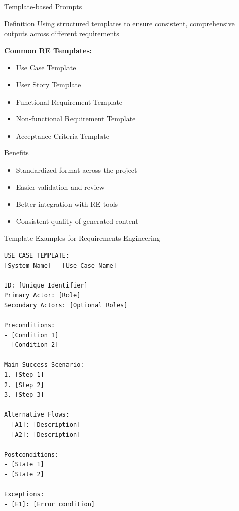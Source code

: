 \documentclass{beamer}
\begin{document}
\begin{frame}{Template-based Prompts}
    \begin{block}{Definition}
        Using structured templates to ensure consistent, comprehensive outputs across different requirements
    \end{block}
    
    \textbf{Common RE Templates:}
    \begin{itemize}
        \item Use Case Template
        \item User Story Template
        \item Functional Requirement Template
        \item Non-functional Requirement Template
        \item Acceptance Criteria Template
    \end{itemize}
    
    \begin{exampleblock}{Benefits}
        \begin{itemize}
            \item Standardized format across the project
        \item Easier validation and review
        \item Better integration with RE tools
        \item Consistent quality of generated content
        \end{itemize}
    \end{exampleblock}
\end{frame}

\begin{frame}[fragile]{Template Examples for Requirements Engineering}
    \begin{lstlisting}[style=code, caption={Use Case Template}]
USE CASE TEMPLATE:
[System Name] - [Use Case Name]

ID: [Unique Identifier]
Primary Actor: [Role]
Secondary Actors: [Optional Roles]

Preconditions:
- [Condition 1]
- [Condition 2]

Main Success Scenario:
1. [Step 1]
2. [Step 2]
3. [Step 3]

Alternative Flows:
- [A1]: [Description]
- [A2]: [Description]

Postconditions:
- [State 1]
- [State 2]

Exceptions:
- [E1]: [Error condition]
    \end{lstlisting}
\end{frame}
\end{document}
